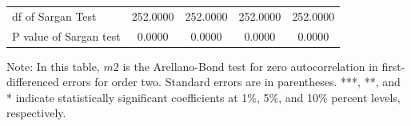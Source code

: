 \begin{table}[H]
\begin{threeparttable}
\begin{tabular}{l|c c| c c}
df of Sargan Test& 252.0000         & 252.0000         & 252.0000         & 252.0000         \\
P value of Sargan test&   0.0000         &   0.0000         &   0.0000         &   0.0000         \\
    \bottomrule
  \end{tabular} 
\begin{tablenotes}
\small
\item Note: In this table, $m2$ is the Arellano-Bond test for zero autocorrelation in first-differenced errors for order two. Standard errors are in parentheses. ***, **, and * indicate statistically significant coefficients at 1\%, 5\%, and 10\% percent levels, respectively.
 \end{tablenotes}
 \end{threeparttable}
\end{table}

